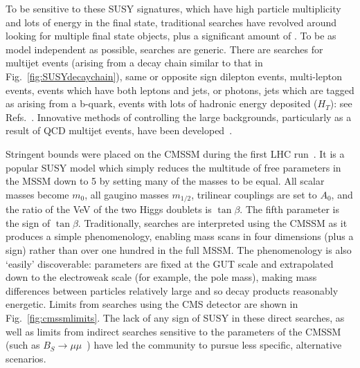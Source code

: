 To be sensitive to these \ac{SUSY} signatures, which have high particle multiplicity and lots of energy in the final state, traditional searches have revolved around looking for multiple final state objects, plus a significant amount of \MET.
To be as model independent as possible, searches are generic.
There are searches for multijet events (arising from a decay chain similar to that in Fig.~\ref{fig:SUSYdecaychain}), 
same or opposite sign dilepton events, multi-lepton events, 
events which have both leptons and jets, or photons,
jets which are tagged as arising from a b-quark, 
events with lots of hadronic energy deposited ($H_{T}$): see Refs.~\cite{CMSdilepbjets,CMSmultijet1,CMSmultijet2,CMSsinlepJets,CMSmultilep,CMSsinglelep,CMSdiphotonH,CMSHZbosons,CMSleptonsWZH}.
Innovative methods of controlling the large backgrounds, particularly as a result of \ac{QCD} multijet events, have been developed~\cite{CMSrazor7TeV,CMSalphaT,CMSmt2}.

Stringent bounds were placed on the \ac{CMSSM} during the first \ac{LHC} run~\cite{constrainedCMSSM,finetuningcmssm}. 
It is a popular \ac{SUSY} model which simply reduces the multitude of free parameters in the \ac{MSSM} down to 5 by setting many of the masses to be equal. 
All scalar masses become $m_{0}$, all gaugino masses $m_{1/2}$, trilinear couplings are set to $A_{0}$, and the ratio of the \ac{VeV} of the two Higgs doublets is $\tan{\beta}$. 
The fifth parameter is the sign of $\tan{\beta}$.
Traditionally, searches are interpreted using the \ac{CMSSM} as it produces a simple phenomenology, enabling mass scans in four dimensions (plus a sign) rather than over one hundred in the full \ac{MSSM}. 
The phenomenology is also `easily' discoverable: parameters are fixed at the \ac{GUT} scale and extrapolated down to the electroweak scale (for example, the \Z pole mass), making mass differences between particles relatively large and so decay products reasonably energetic. 
Limits from searches using the CMS detector are shown in Fig.~\ref{fig:cmssmlimits}.
The lack of any sign of \ac{SUSY} in these direct searches, as well as limits from indirect searches sensitive to the parameters of the \ac{CMSSM} (such as $B_{S}\rightarrow \mu\mu$~\cite{BSmumuCombo}) have led the community to pursue less specific, alternative scenarios.


